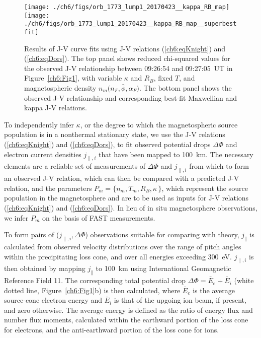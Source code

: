 
  \begin{figure}
    \centering
    \noindent\texttt{[image: ./ch6/figs/orb\_1773\_lump1\_20170423\_\_kappa\_RB\_map]}
    \noindent\texttt{[image: ./ch6/figs/orb\_1773\_lump1\_20170423\_\_kappa\_RB\_map\_\_superbestfit]}
    \caption[Orbit 1773: Reduced chi-squared values for observed J-V curves with
    variable $\kappa$ and $R_B$, fixed $T$, and magnetospheric density $n_m \big
    ( n_F, \bar{\phi}, \alpha_F \big )$, and corresponding best-fit J-V
    curves.]{Results of J-V curve fits using J-V relations (\ref{ch6:eqKnight})
      and (\ref{ch6:eqDors}). The top panel shows reduced chi-squared values for
      the observed J-V relationship between 09:26:54 and 09:27:05~UT in
      Figure~\ref{ch6:Fig1}, with variable $\kappa$ and $R_B$, fixed $T$, and
      magnetospheric density $n_m \big ( n_F, \bar{\phi}, \alpha_F \big )$. The
      bottom panel shows the observed J-V relationship and corresponding
      best-fit Maxwellian and kappa J-V relations.}
    \label{ch6:Fig3}
  \end{figure}


  To independently infer $\kappa$, or the degree to which the magnetospheric
  source population is in a nonthermal stationary state, we use the J-V
  relations (\ref{ch6:eqKnight}) and (\ref{ch6:eqDors}), to fit observed
  potential drops $\Delta \Phi$ and electron current densities $j_{\parallel,i}$
  that have been mapped to 100~km. The necessary elements are a reliable set of
  measurements of $\Delta \Phi$ and $j_{\parallel,i}$ from which to form an
  observed J-V relation, which can then be compared with a predicted J-V
  relation, and the parameters $P_m = \{ n_m, T_m, R_B, \kappa \, \}$, which
  represent the source population in the magnetosphere and are to be used as
  inputs for J-V relations (\ref{ch6:eqKnight}) and (\ref{ch6:eqDors}). In lieu
  of in situ magnetosphere observations, we infer $P_m$ on the basis of FAST
  measurements.

  To form pairs of ($j_{\parallel,i}, \Delta \Phi$) observations suitable for
  comparing with theory, $j_\parallel$ is calculated from observed velocity
  distributions over the range of pitch angles within the precipitating loss
  cone, and over all energies exceeding 300~eV.  $j_{\parallel,i}$ is then
  obtained by mapping $j_\parallel$ to 100~km using International Geomagnetic
  Reference Field 11. The corresponding total potential drop $\Delta \Phi =
  \bar{E}_e + \bar{E}_i$ (white dotted line, Figure~\ref{ch6:Fig1}b) is then
  calculated, where $\bar{E}_e$ is the average source-cone electron energy and
  $\bar{E}_i$ is that of the upgoing ion beam, if present, and zero
  otherwise. The average energy is defined as the ratio of energy flux and
  number flux moments, calculated within the earthward portion of the loss cone
  for electrons, and the anti-earthward portion of the loss cone for ions.

